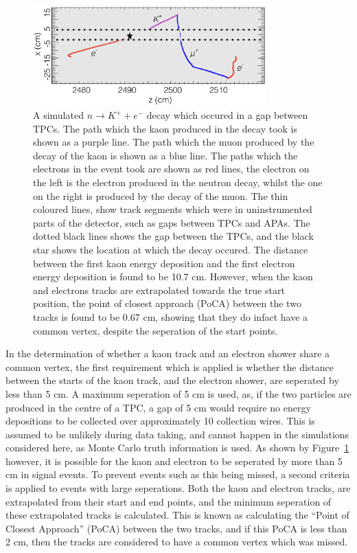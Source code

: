 \begin{figure}[h!]
  \centering
  \includegraphics[width=0.8\textwidth]{KaonElecBigGap}
  \caption[A simulated $n \rightarrow K^{+} + e^{-}$ decay which occured in a gap between TPCs]
          {A simulated $n \rightarrow K^{+} + e^{-}$ decay which occured in a gap between TPCs. The path which the kaon produced in the decay took is shown as a purple line. The path which the muon produced by the decay of the kaon is shown as a blue line. The paths which the electrons in the event took are shown as red lines, the electron on the left is the electron produced in the neutron decay, whilst the one on the right is produced by the decay of the muon. The thin coloured lines, show track segments which were in uninstrumented parts of the detector, such as gaps between TPCs and APAs. The dotted black lines shows the gap between the TPCs, and the black star shows the location at which the decay occured. The distance between the first kaon energy deposition and the first electron energy deposition is found to be 10.7 cm. However, when the kaon and electrons tracks are extrapolated towards the true start position, the point of closest approach (PoCA) between the two tracks is found to be 0.67 cm, showing that they do infact have a common vertex, despite the seperation of the start points.} 
  \label{fig:NDK_Sig_KEBigGap}
\end{figure}

In the determination of whether a kaon track and an electron shower share a common vertex, the first requirement which is applied is whether the distance between the starts of the kaon track, and the electron shower, are seperated by less than 5 cm. A maximum seperation of 5 cm is used, as, if the two particles are produced in the centre of a TPC, a gap of 5 cm would require no energy depositions to be collected over approximately 10 collection wires. This is assumed to be unlikely during data taking, and cannot happen in the simulations considered here, as Monte Carlo truth information is used. As shown by Figure~\ref{fig:NDK_Sig_KEBigGap} however, it is possible for the kaon and electron to be seperated by more than 5 cm in signal events. To prevent events such as this being missed, a second criteria is applied to events with large seperations. Both the kaon and electron tracks, are extrapolated from their start and end points, and the minimum seperation of these extrapolated tracks is calculated. This is known as calculating the ``Point of Closest Approach'' (PoCA) between the two tracks, and if this PoCA is less than 2 cm, then the tracks are considered to have a common vertex which was missed. \\

